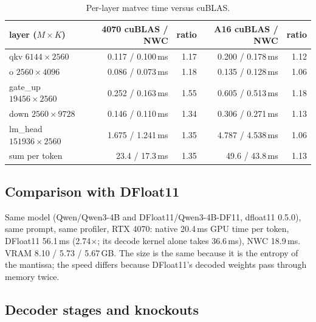 \documentclass[11pt]{article}
\begin{document}
\begin{table}[h]\centering
\begin{tabular}{lrrrr}\toprule
layer ($M \times K$) & 4070 cuBLAS / NWC & ratio & A16 cuBLAS / NWC & ratio \\\midrule
qkv $6144 \times 2560$ & 0.117 / 0.100\,ms & 1.17 & 0.200 / 0.178\,ms & 1.12 \\
o $2560 \times 4096$ & 0.086 / 0.073\,ms & 1.18 & 0.135 / 0.128\,ms & 1.06 \\
gate\_up $19456 \times 2560$ & 0.252 / 0.163\,ms & 1.55 & 0.605 / 0.513\,ms & 1.18 \\
down $2560 \times 9728$ & 0.146 / 0.110\,ms & 1.34 & 0.306 / 0.271\,ms & 1.13 \\
lm\_head $151936 \times 2560$ & 1.675 / 1.241\,ms & 1.35 & 4.787 / 4.538\,ms & 1.06 \\
sum per token & 23.4 / 17.3\,ms & 1.35 & 49.6 / 43.8\,ms & 1.13 \\\bottomrule
\end{tabular}
\caption{Per-layer matvec time versus cuBLAS.}
\end{table}

\subsection{Comparison with DFloat11}

Same model (Qwen/Qwen3-4B and DFloat11/Qwen3-4B-DF11, dfloat11 0.5.0), same prompt, same profiler, RTX
4070: native 20.4\,ms GPU time per token, DFloat11 56.1\,ms (2.74$\times$; its decode kernel alone takes
36.6\,ms), NWC 18.9\,ms. VRAM 8.10 / 5.73 / 5.67\,GB. The size is the same because it is the entropy of the
mantissa; the speed differs because DFloat11's decoded weights pass through memory twice.

\subsection{Decoder stages and knockouts}
\label{sec:history}
\end{document}
